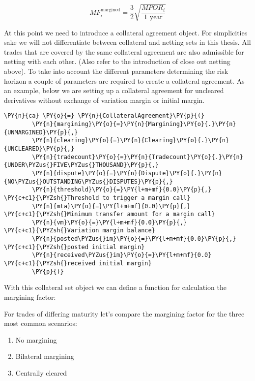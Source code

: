 \[ MF^{\text{margined}}_i = \frac{3}{2}\sqrt{\frac{MPOR_i}{1\text{ year}}} \]

At this point we need to introduce a collateral agreement object. For
simplicities sake we will not differentiate between collateral and
netting sets in this thesis. All trades that are covered by the same
collateral agreement are also admissible for netting with each other.
(Also refer to the introduction of close out netting above). To take
into account the different parameters determining the risk horizon a
couple of parameters are required to create a collateral agreement. As
an example, below we are setting up a collateral agreement for uncleared
derivatives without exchange of variation margin or initial margin.

    \begin{tcolorbox}[breakable, size=fbox, boxrule=1pt, pad at break*=1mm,colback=cellbackground, colframe=cellborder]
\begin{Verbatim}[commandchars=\\\{\}]
\PY{n}{ca} \PY{o}{=} \PY{n}{CollateralAgreement}\PY{p}{(}
        \PY{n}{margining}\PY{o}{=}\PY{n}{Margining}\PY{o}{.}\PY{n}{UNMARGINED}\PY{p}{,}
        \PY{n}{clearing}\PY{o}{=}\PY{n}{Clearing}\PY{o}{.}\PY{n}{UNCLEARED}\PY{p}{,}
        \PY{n}{tradecount}\PY{o}{=}\PY{n}{Tradecount}\PY{o}{.}\PY{n}{UNDER\PYZus{}FIVE\PYZus{}THOUSAND}\PY{p}{,}
        \PY{n}{dispute}\PY{o}{=}\PY{n}{Dispute}\PY{o}{.}\PY{n}{NO\PYZus{}OUTSTANDING\PYZus{}DISPUTES}\PY{p}{,}
        \PY{n}{threshold}\PY{o}{=}\PY{l+m+mf}{0.0}\PY{p}{,}      \PY{c+c1}{\PYZsh{}Threshold to trigger a margin call}
        \PY{n}{mta}\PY{o}{=}\PY{l+m+mf}{0.0}\PY{p}{,}            \PY{c+c1}{\PYZsh{}Minimum transfer amount for a margin call}
        \PY{n}{vm}\PY{o}{=}\PY{l+m+mf}{0.0}\PY{p}{,}             \PY{c+c1}{\PYZsh{}Variation margin balance}
        \PY{n}{posted\PYZus{}im}\PY{o}{=}\PY{l+m+mf}{0.0}\PY{p}{,}      \PY{c+c1}{\PYZsh{}posted initial margin}
        \PY{n}{received\PYZus{}im}\PY{o}{=}\PY{l+m+mf}{0.0}     \PY{c+c1}{\PYZsh{}received initial margin}
        \PY{p}{)}
\end{Verbatim}
\end{tcolorbox}

    With this collateral set object we can define a function for calculation
the margining factor:

    For trades of differing maturity let's compare the margining factor for
the three most common scenarios:

\begin{enumerate}
\def\labelenumi{\arabic{enumi}.}
\tightlist
\item
  No margining
\item
  Bilateral margining
\item
  Centrally cleared
\end{enumerate}

